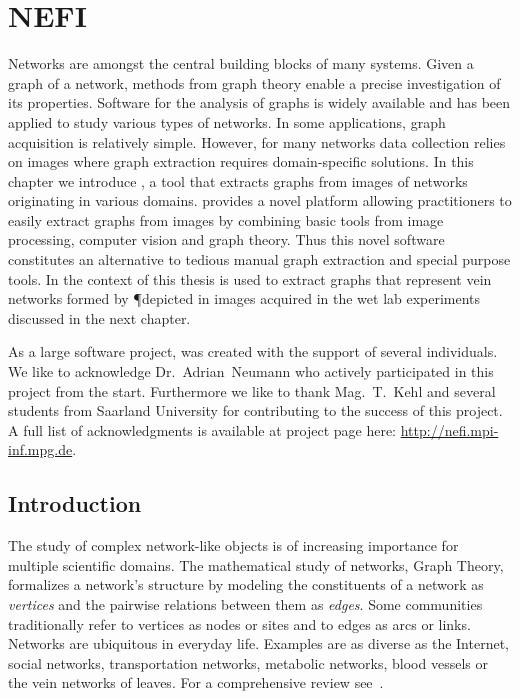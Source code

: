 \chapter{NEFI}

	Networks are amongst the central building blocks of many systems. Given a graph of a network, methods from graph theory enable a precise investigation of its properties. Software for the analysis of graphs is widely available and has been applied to study various types of networks. In some applications, graph acquisition is relatively simple. However, for many networks data collection relies on images where graph extraction requires domain-specific solutions.	In this chapter we introduce \NEFI, a tool that extracts graphs from images of networks originating in various domains. \NEFI provides a novel platform allowing practitioners to easily extract graphs from images by combining basic tools from image processing, computer vision and graph theory. Thus this novel software constitutes an alternative to tedious manual graph extraction and special purpose tools. In the context of this thesis \NEFI is used to extract graphs that represent vein networks formed by \P depicted in images acquired in the wet lab experiments discussed in the next chapter.

	As a large software project, \NEFI was created with the support of several individuals. We like to acknowledge Dr.~Adrian~Neumann who actively participated in this project from the start. Furthermore we like to thank Mag.~T.~Kehl and several students from Saarland University for contributing to the success of this project. A full list of acknowledgments is available at \NEFIs project page here: \href{http://nefi.mpi-inf.mpg.de}{http://nefi.mpi-inf.mpg.de}.



\section{Introduction}

	The study of complex network-like objects is of increasing importance for multiple scientific domains. 
	The mathematical study of networks, Graph Theory, formalizes a network's structure by modeling the constituents of a network as \emph{vertices} and the pairwise relations between them as \emph{edges}. Some communities traditionally refer to vertices as nodes or sites and to edges as arcs or links. Networks are ubiquitous in everyday life. Examples are as diverse as the Internet, social networks, transportation networks, metabolic networks, blood vessels or the vein networks of leaves. For a comprehensive review see~\cite{newman2003}. 

